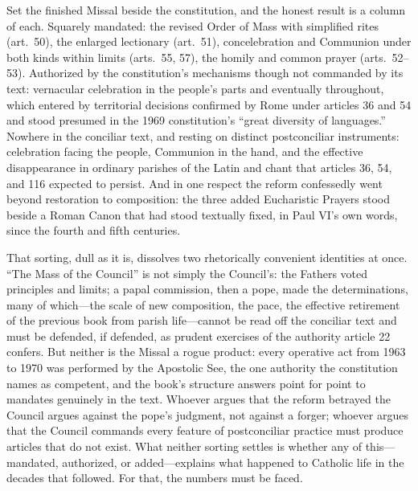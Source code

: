 Set the finished Missal beside the constitution, and the honest result is a column of each. Squarely mandated: the revised Order of Mass with simplified rites (art.~50), the enlarged lectionary (art.~51), concelebration and Communion under both kinds within limits (arts.~55, 57), the homily and common prayer (arts.~52--53). Authorized by the constitution's mechanisms though not commanded by its text: vernacular celebration in the people's parts and eventually throughout, which entered by territorial decisions confirmed by Rome under articles 36 and 54 and stood presumed in the 1969 constitution's ``great diversity of languages.'' Nowhere in the conciliar text, and resting on distinct postconciliar instruments: celebration facing the people, Communion in the hand, and the effective disappearance in ordinary parishes of the Latin and chant that articles 36, 54, and 116 expected to persist. And in one respect the reform confessedly went beyond restoration to composition: the three added Eucharistic Prayers stood beside a Roman Canon that had stood textually fixed, in Paul VI's own words, since the fourth and fifth centuries.

That sorting, dull as it is, dissolves two rhetorically convenient identities at once. ``The Mass of the Council'' is not simply the Council's: the Fathers voted principles and limits; a papal commission, then a pope, made the determinations, many of which---the scale of new composition, the pace, the effective retirement of the previous book from parish life---cannot be read off the conciliar text and must be defended, if defended, as prudent exercises of the authority article 22 confers. But neither is the Missal a rogue product: every operative act from 1963 to 1970 was performed by the Apostolic See, the one authority the constitution names as competent, and the book's structure answers point for point to mandates genuinely in the text. Whoever argues that the reform betrayed the Council argues against the pope's judgment, not against a forger; whoever argues that the Council commands every feature of postconciliar practice must produce articles that do not exist. What neither sorting settles is whether any of this---mandated, authorized, or added---explains what happened to Catholic life in the decades that followed. For that, the numbers must be faced.
